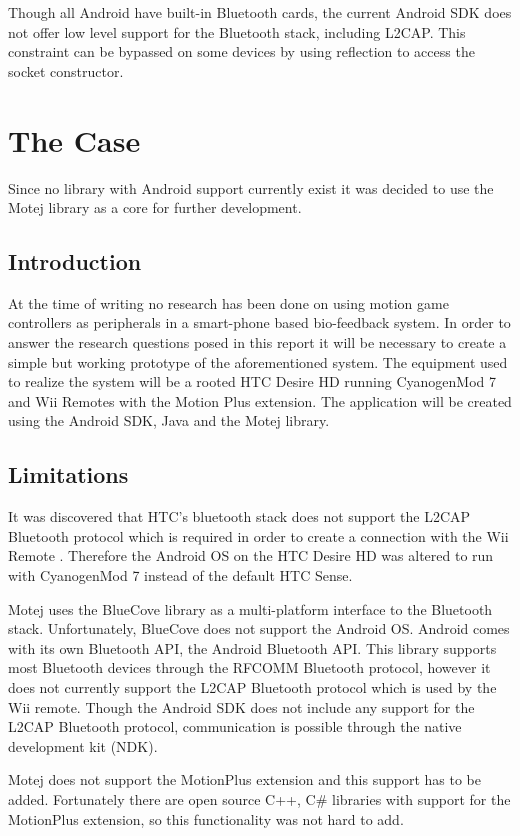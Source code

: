 \documentclass[11pt,twoside,a4paper]{report}
\begin{document}
Though all Android have built-in Bluetooth cards, the current Android SDK does not offer low level support for the Bluetooth stack, including L2CAP. This constraint can be bypassed on some devices by using reflection to access the socket constructor. %


\chapter{The Case}
Since no library with Android support currently exist it was decided to use the Motej library as a core for further development.

\section{Introduction}
At the time of writing no research has been done on using motion game controllers as peripherals in a smart-phone based bio-feedback system. In order to answer the research questions posed in this report it will be necessary to create a simple but working prototype of the aforementioned system. The equipment used to realize the system will be a rooted HTC Desire HD \cite{Desire_HD_specs} running CyanogenMod 7 \cite{cyanogenMod} and Wii Remotes with the Motion Plus extension. The application will be created using the Android SDK, Java and the Motej library.

\section{Limitations}
It was discovered that HTC's bluetooth stack does not support the L2CAP Bluetooth protocol which is required in order to create a connection with the Wii Remote \cite{l2cap_htc}. Therefore the Android OS on the HTC Desire HD was altered to run with CyanogenMod 7 instead of the default HTC Sense.

Motej uses the BlueCove library as a multi-platform interface to the Bluetooth stack. Unfortunately, BlueCove does not support the Android OS. Android comes with its own Bluetooth API, the Android Bluetooth API. This library supports most Bluetooth devices through the RFCOMM Bluetooth protocol, however it does not currently support the L2CAP Bluetooth protocol which is used by the Wii remote. Though the Android SDK does not include any support for the L2CAP Bluetooth protocol, communication is possible through the native development kit (NDK). %

Motej does not support the MotionPlus extension and this support has to be added. Fortunately there are open source C++, C\# libraries with support for the MotionPlus extension, so this functionality was not hard to add.




\end{document}
